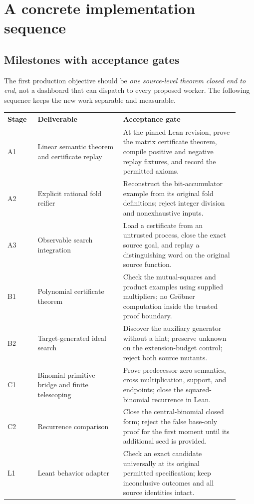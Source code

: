 \section{A concrete implementation sequence}
\label{sec:roadmap}

\subsection{Milestones with acceptance gates}

The first production objective should be \emph{one source-level theorem closed
end to end}, not a dashboard that can dispatch to every proposed worker. The
following sequence keeps the new work separable and measurable.

\begin{longtable}{@{}p{0.12\linewidth}p{0.34\linewidth}p{0.46\linewidth}@{}}
\toprule
Stage & Deliverable & Acceptance gate\\
\midrule\endhead
A1 & Linear semantic theorem and certificate replay &
At the pinned Lean revision, prove the matrix certificate theorem, compile
positive and negative replay fixtures, and record the permitted axioms.\\
A2 & Explicit rational fold reifier &
Reconstruct the bit-accumulator example from its original fold definitions;
reject integer division and nonexhaustive inputs.\\
A3 & Observable search integration &
Load a certificate from an untrusted process, close the exact source goal,
and replay a distinguishing word on the original source function.\\
B1 & Polynomial certificate theorem &
Check the mutual-squares and product examples using supplied multipliers; no
Gr\"obner computation inside the trusted proof boundary.\\
B2 & Target-generated ideal search &
Discover the auxiliary generator without a hint; preserve unknown on the
extension-budget control; reject both source mutants.\\
C1 & Binomial primitive bridge and finite telescoping &
Prove predecessor-zero semantics, cross multiplication, support, and endpoints;
close the squared-binomial recurrence in Lean.\\
C2 & Recurrence comparison &
Close the central-binomial closed form; reject the false base-only proof for
the first moment until its additional seed is provided.\\
L1 & Leant behavior adapter &
Check an exact candidate universally at its original permitted specification;
keep inconclusive outcomes and all source identities intact.\\
\bottomrule
\end{longtable}


